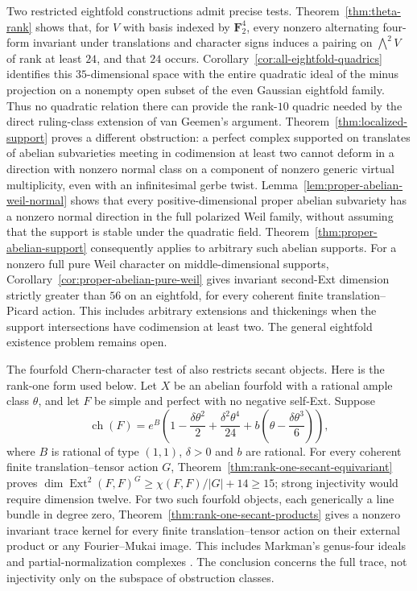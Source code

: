 \documentclass[11pt]{article}
\theoremstyle{definition}
\theoremstyle{remark}
\begin{document}
Two restricted eightfold constructions admit precise tests. Theorem~\ref{thm:theta-rank} shows that, for $V$ with basis indexed by $\mathbf F_2^4$, every nonzero alternating four-form invariant under translations and character signs induces a pairing on $\bigwedge^2V$ of rank at least $24$, and that $24$ occurs. Corollary~\ref{cor:all-eightfold-quadrics} identifies this $35$-dimensional space with the entire quadratic ideal of the minus projection on a nonempty open subset of the even Gaussian eightfold family. Thus no quadratic relation there can provide the rank-$10$ quadric needed by the direct ruling-class extension of van Geemen's argument. Theorem~\ref{thm:localized-support} proves a different obstruction: a perfect complex supported on translates of abelian subvarieties meeting in codimension at least two cannot deform in a direction with nonzero normal class on a component of nonzero generic virtual multiplicity, even with an infinitesimal gerbe twist. Lemma~\ref{lem:proper-abelian-weil-normal} shows that every
positive-dimensional proper abelian subvariety has a nonzero normal
direction in the full polarized Weil family, without assuming that
the support is stable under the quadratic field.
Theorem~\ref{thm:proper-abelian-support} consequently applies to
arbitrary such abelian supports. For a nonzero full pure Weil
character on middle-dimensional supports,
Corollary~\ref{cor:proper-abelian-pure-weil} gives invariant
second-Ext dimension strictly greater than $56$ on an eightfold,
for every coherent finite translation--Picard action.
This includes arbitrary extensions and thickenings when the
support intersections have codimension at least two.
The general eightfold existence problem remains open.

The fourfold Chern-character test of
\cite[Theorems~B--C and $B_G$]{SecantCharacterTest}
also restricts secant objects. Here is the rank-one form used below.
Let $X$ be an abelian fourfold with a rational ample class $\theta$,
and let $F$ be simple and perfect with no negative self-Ext. Suppose
\[
 \operatorname{ch}(F)=e^B\left(
 1-\frac{\delta\theta^2}{2}+\frac{\delta^2\theta^4}{24}
 +b\left(\theta-\frac{\delta\theta^3}{6}\right)\right),
\]
where $B$ is rational of type $(1,1)$, $\delta>0$ and $b$ are rational.
For every coherent finite translation--tensor action $G$,
Theorem~\ref{thm:rank-one-secant-equivariant} proves
$\dim\operatorname{Ext}^2(F,F)^G\ge\chi(F,F)/|G|+14\ge15$;
strong injectivity would require dimension twelve.
For two such fourfold objects, each generically a line bundle in
degree zero, Theorem~\ref{thm:rank-one-secant-products} gives a
nonzero invariant trace kernel for every finite translation--tensor
action on their external product or any Fourier--Mukai image.
This includes Markman's genus-four ideals and partial-normalization
complexes \cite[Example~8.2.3, pp.~52--54]{MarkmanSecantFourfold}.
The conclusion concerns the full trace, not injectivity only on
the subspace of obstruction classes.
\end{document}
